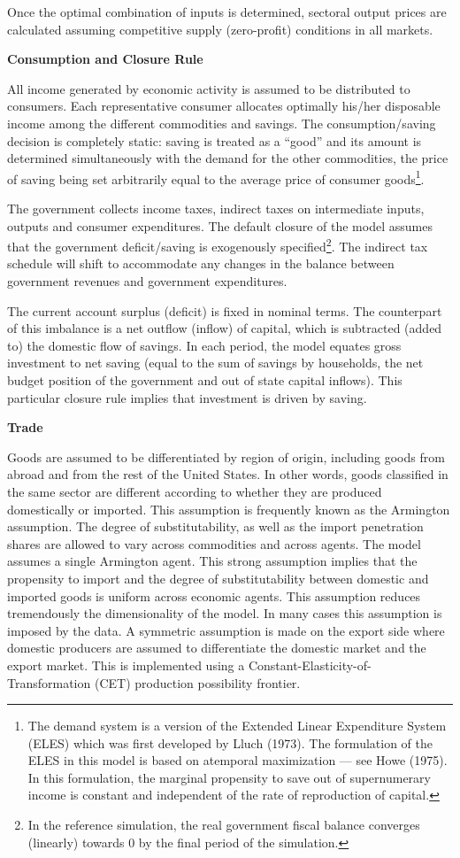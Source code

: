 \documentclass[12pt]{article}
\begin{document}
Once the optimal combination of inputs is determined, sectoral output prices are calculated assuming competitive supply (zero-profit) conditions in all markets.

\textbf{Consumption and Closure Rule}

All income generated by economic activity is assumed to be distributed to consumers. Each representative consumer allocates optimally his/her disposable income among the different commodities and savings. The consumption/saving decision is completely static: saving is treated as a “good” and its amount is determined simultaneously with the demand for the other commodities, the price of saving being set arbitrarily equal to the average price of consumer goods\footnote{ The demand system is a version of the Extended Linear Expenditure System (ELES) which was first developed by Lluch (1973). The formulation of the ELES in this model is based on atemporal maximization — see Howe (1975). In this formulation, the marginal propensity to save out of supernumerary income is constant and independent of the rate of reproduction of capital.}.

The government collects income taxes, indirect taxes on intermediate inputs, outputs and consumer expenditures. The default closure of the model assumes that the government deficit/saving is exogenously specified\footnote{In the reference simulation, the real government fiscal balance converges (linearly) towards 0 by the final period of the simulation.}. The indirect tax schedule will shift to accommodate any changes in the balance between government revenues and government expenditures.

The current account surplus (deficit) is fixed in nominal terms. The counterpart of this imbalance is a net outflow (inflow) of capital, which is subtracted (added to) the domestic flow of savings. In each period, the model equates gross investment to net saving (equal to the sum of savings by households, the net budget position of the government and out of state capital inflows). This particular closure rule implies that investment is driven by saving.

\textbf{Trade}

Goods are assumed to be differentiated by region of origin, including goods from abroad and from the rest of the United States. In other words, goods classified in the same sector are different according to whether they are produced domestically or imported. This assumption is frequently known as the Armington assumption. The degree of substitutability, as well as the import penetration shares are allowed to vary across commodities and across agents. The model assumes a single Armington agent. This strong assumption implies that the propensity to import and the degree of substitutability between domestic and imported goods is uniform across economic agents. This assumption reduces tremendously the dimensionality of the model. In many cases this assumption is imposed by the data. A symmetric assumption is made on the export side where domestic producers are assumed to differentiate the domestic market and the export market. This is implemented using a Constant-Elasticity-of-Transformation (CET) production possibility frontier.
\end{document}

